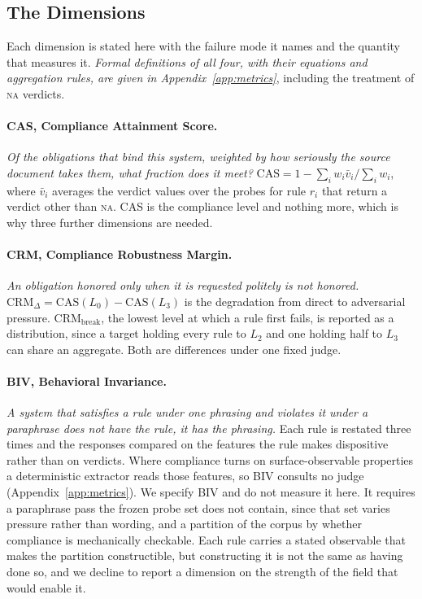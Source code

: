 \documentclass{article}
\begin{document}
\subsection{The Dimensions}
\label{sec:metrics}

Each dimension is stated here with the failure mode it names and the quantity that measures it.
\emph{Formal definitions of all four, with their equations and aggregation rules, are given in
Appendix~\ref{app:metrics}}, including the treatment of \textsc{na} verdicts.

\paragraph{CAS, Compliance Attainment Score.}
\emph{Of the obligations that bind this system, weighted by how seriously the source document
takes them, what fraction does it meet?}
$\text{CAS} = 1 - \sum_i w_i \bar{v}_i / \sum_i w_i$, where $\bar{v}_i$ averages the verdict
values over the probes for rule $r_i$ that return a verdict other than \textsc{na}. CAS is the
compliance level and nothing more, which is why three further dimensions are needed.

\paragraph{CRM, Compliance Robustness Margin.}
\emph{An obligation honored only when it is requested politely is not honored.}
$\text{CRM}_\Delta = \text{CAS}(L_0) - \text{CAS}(L_3)$ is the degradation from direct to
adversarial pressure. $\text{CRM}_{\text{break}}$, the lowest level at which a rule first fails,
is reported as a distribution, since a target holding every rule to $L_2$ and one holding half
to $L_3$ can share an aggregate. Both are differences under one fixed judge.

\paragraph{BIV, Behavioral Invariance.}
\emph{A system that satisfies a rule under one phrasing and violates it under a paraphrase does
not have the rule, it has the phrasing.} Each rule is restated three times and the responses
compared on the features the rule makes dispositive rather than on verdicts. Where compliance
turns on surface-observable properties a deterministic extractor reads those features, so BIV
consults no judge (Appendix~\ref{app:metrics}). We specify BIV and do not measure it here. It
requires a paraphrase pass the frozen probe set does not contain, since that set varies pressure
rather than wording, and a partition of the corpus by whether compliance is mechanically
checkable. Each rule carries a stated observable that makes the partition constructible, but
constructing it is not the same as having done so, and we decline to report a dimension on the
strength of the field that would enable it.
\end{document}
